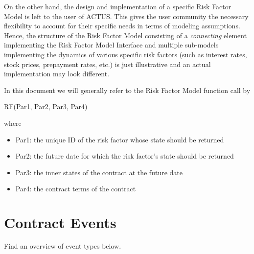 \documentclass[9pt,oneside]{amsart}
\begin{document}
\begin{multicols}{2}


On the other hand, the design and implementation of a specific Risk Factor Model is left to the user of ACTUS. This gives the user community the necessary flexibility to account for their specific needs in terms of modeling assumptions. Hence, the structure of the Risk Factor Model consisting of a \textit{connecting} element implementing the Risk Factor Model Interface and multiple sub-models implementing the dynamics of various specific risk factors (such as interest rates, stock prices, prepayment rates, etc.) is just illustrative and an actual implementation may look different.

In this document we will generally refer to the Risk Factor Model function call by\par

RF(Par1, Par2, Par3, Par4)\par

where

\begin{itemize}
	\item Par1: the unique ID of the risk factor whose state should be returned

	\item Par2: the future date for which the risk factor’s state should be returned

	\item Par3: the inner states of the contract at the future date

	\item Par4: the contract terms of the contract
\end{itemize}



\section{Contract Events}\label{sec:events}

Find an overview of event types below.





\end{multicols}
\end{document}
